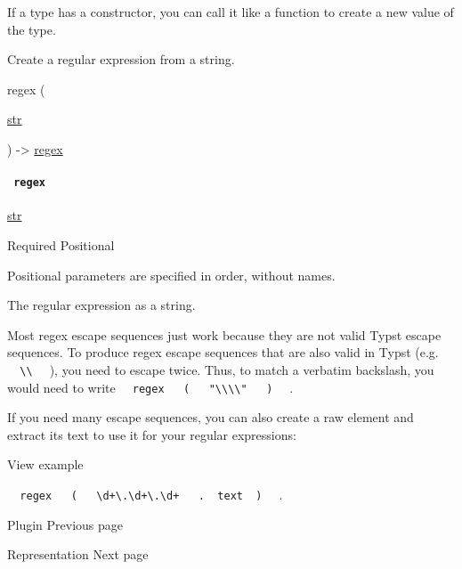 \label{constructor-constructor-tooltip}
If a type has a constructor, you can call it like a function to create a
new value of the type.

Create a regular expression from a string.

{ regex } (

{ \href{/docs/reference/foundations/str/}{str} }

) -\textgreater{} \href{/docs/reference/foundations/regex/}{regex}

\paragraph{\texorpdfstring{\texttt{\ regex\ }}{ regex }}\label{constructor-regex}

\href{/docs/reference/foundations/str/}{str}

{Required} {{ Positional }}

\label{constructor-regex-positional-tooltip}
Positional parameters are specified in order, without names.

The regular expression as a string.

Most regex escape sequences just work because they are not valid Typst
escape sequences. To produce regex escape sequences that are also valid
in Typst (e.g.
\texttt{\ }{\texttt{\ \textbackslash{}\textbackslash{}\ }}\texttt{\ } ),
you need to escape twice. Thus, to match a verbatim backslash, you would
need to write
\texttt{\ }{\texttt{\ regex\ }}\texttt{\ }{\texttt{\ (\ }}\texttt{\ }{\texttt{\ "\textbackslash{}\textbackslash{}\textbackslash{}\textbackslash{}"\ }}\texttt{\ }{\texttt{\ )\ }}\texttt{\ }
.

If you need many escape sequences, you can also create a raw element and
extract its text to use it for your regular expressions:


View example

\texttt{\ }{\texttt{\ regex\ }}\texttt{\ }{\texttt{\ (\ }}\texttt{\ }{\texttt{\ \textasciigrave{}\textbackslash{}d+\textbackslash{}.\textbackslash{}d+\textbackslash{}.\textbackslash{}d+\textasciigrave{}\ }}\texttt{\ }{\texttt{\ .\ }}\texttt{\ text\ }{\texttt{\ )\ }}\texttt{\ }
.

\href{/docs/reference/foundations/plugin/}{\pandocbounded{}}

{ Plugin } { Previous page }

\href{/docs/reference/foundations/repr/}{\pandocbounded{}}

{ Representation } { Next page }
